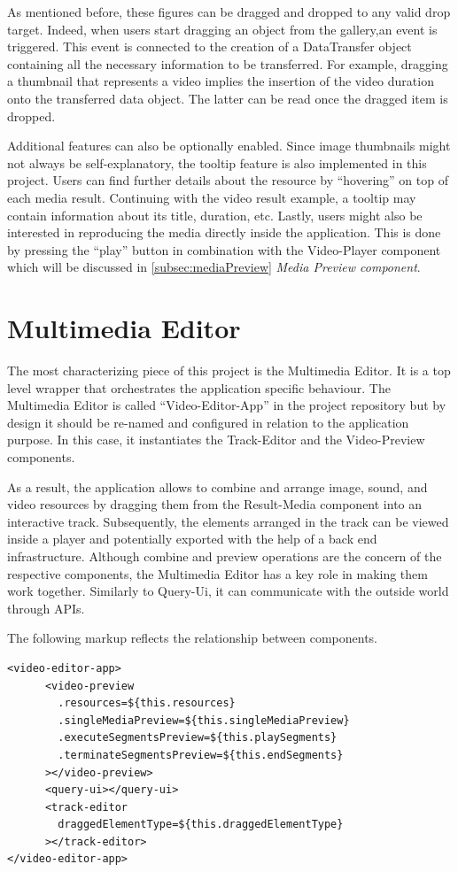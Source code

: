 As mentioned before, these figures can be dragged and dropped to any valid drop target. Indeed, when users start dragging an object from the gallery,an event is triggered. This event is connected to the creation of a DataTransfer object containing all the necessary information to be transferred. For example, dragging a thumbnail that represents a video implies the insertion of the video duration onto the transferred data object. The latter can be read once the dragged item is dropped.

Additional features can also be optionally enabled. Since image thumbnails might not always be self-explanatory, the tooltip feature is also implemented in this project. Users can find further details about the resource by “hovering” on top of each media result. Continuing with the video result example, a tooltip may contain information about its title, duration, etc. Lastly, users might also be interested in reproducing the media directly inside the application. This is done by pressing the “play” button in combination with the Video-Player component which will be discussed in \ref{subsec:mediaPreview} \emph{Media Preview component}.

\section{Multimedia Editor}
\label{sec:multimediaEditor}

The most characterizing piece of this project is the Multimedia Editor. It is a top level wrapper that orchestrates the application specific behaviour. The Multimedia Editor is called “Video-Editor-App” in the project repository but by design it should be re-named and configured in relation to the application purpose. In this case, it instantiates the Track-Editor and the Video-Preview components.

As a result, the application allows to combine and arrange image, sound, and video resources by dragging them from the Result-Media component into an interactive track. Subsequently, the elements arranged in the track can be viewed inside a player and potentially exported with the help of a back end infrastructure. Although combine and preview operations are the concern of the respective components, the Multimedia Editor has a key role in making them work together. Similarly to Query-Ui, it can communicate with the outside world through APIs.

The following markup reflects the relationship between components.
\\
\begin{lstlisting}[caption={Video-Editor-App component instantiation},label={videoAppComp}, language=HTML5]
<video-editor-app>      
      <video-preview
        .resources=${this.resources}
        .singleMediaPreview=${this.singleMediaPreview}
        .executeSegmentsPreview=${this.playSegments}
        .terminateSegmentsPreview=${this.endSegments}
      ></video-preview>
      <query-ui></query-ui>
      <track-editor
        draggedElementType=${this.draggedElementType}
      ></track-editor>
</video-editor-app>
\end{lstlisting}


